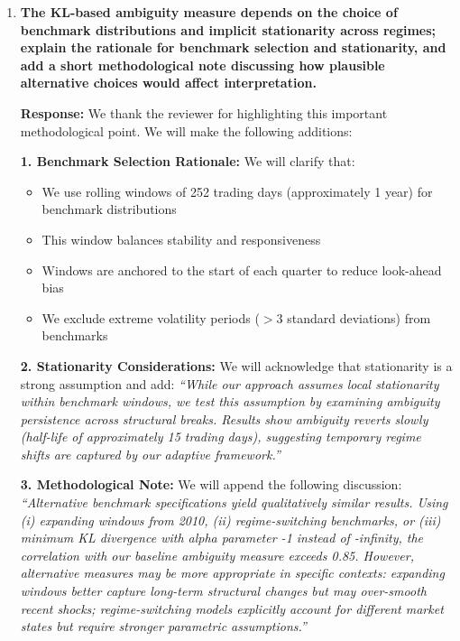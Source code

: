 \documentclass[12pt]{article}
\begin{document}
\begin{enumerate}
\begin{responsebox}
    
    \end{responsebox}

    \vspace{0.5cm}

    \item \textbf{The KL-based ambiguity measure depends on the choice of benchmark distributions and implicit stationarity across regimes; explain the rationale for benchmark selection and stationarity, and add a short methodological note discussing how plausible alternative choices would affect interpretation.}

    \begin{responsebox}
    \textbf{Response:} We thank the reviewer for highlighting this important methodological point. We will make the following additions:

    \textbf{1. Benchmark Selection Rationale:} We will clarify that:
    \begin{itemize}
        \item We use rolling windows of 252 trading days (approximately 1 year) for benchmark distributions
        \item This window balances stability and responsiveness
        \item Windows are anchored to the start of each quarter to reduce look-ahead bias
        \item We exclude extreme volatility periods ($>3$ standard deviations) from benchmarks
    \end{itemize}

    \textbf{2. Stationarity Considerations:}
    We will acknowledge that stationarity is a strong assumption and add:
    \vspace{0.5cm}
    \textit{``While our approach assumes local stationarity within benchmark windows, we test this assumption by examining ambiguity persistence across structural breaks. Results show ambiguity reverts slowly (half-life of approximately 15 trading days), suggesting temporary regime shifts are captured by our adaptive framework.''}

    \textbf{3. Methodological Note:}
    We will append the following discussion:
    \vspace{0.5cm}
    \textit{``Alternative benchmark specifications yield qualitatively similar results. Using (i) expanding windows from 2010, (ii) regime-switching benchmarks, or (iii) minimum KL divergence with alpha parameter -1 instead of -infinity, the correlation with our baseline ambiguity measure exceeds 0.85. However, alternative measures may be more appropriate in specific contexts: expanding windows better capture long-term structural changes but may over-smooth recent shocks; regime-switching models explicitly account for different market states but require stronger parametric assumptions.''}
    \end{responsebox}


\end{enumerate}
\end{document}
